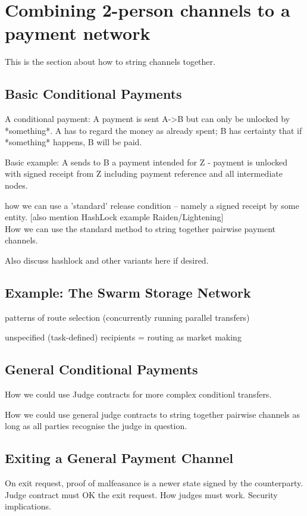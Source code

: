 \section{Combining 2-person channels to a payment network}

This is the section about how to string channels together.

\subsection{Basic Conditional Payments}
 A conditional payment: A payment is sent A->B but can only be unlocked by *something*. A has to regard the money as already spent; B has certainty that if *something* happens, B will be paid.
 
Basic example: A sends to B a payment intended for Z - payment is unlocked with signed receipt from Z including payment reference and all intermediate nodes.

how we can use a 'standard' release condition -- namely a signed receipt by some entity. [also mention HashLock example Raiden/Lightening]\\
How we can use the standard method to string together pairwise payment channels. 

Also discuss hashlock and other variants here if desired.

\subsection{Example: The Swarm Storage Network}

patterns of route selection (concurrently running parallel transfers)

unspecified (task-defined) recipients = routing as market making

\subsection{General Conditional Payments}
How we could use Judge contracts for more complex conditionl transfers. %

How we could use general judge contracts to string together pairwise channels as long as all parties recognise the judge in question.

\subsection{Exiting a General Payment Channel}
On exit request, proof of malfeasance is a newer state signed by the counterparty. 
Judge contract must OK the exit request.
How judges must work. Security implications.



